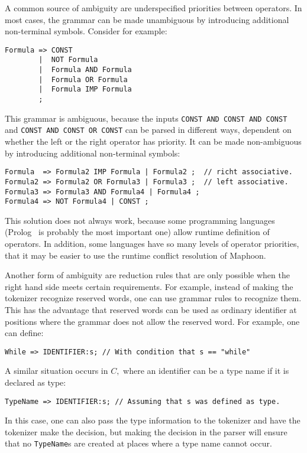 \documentclass{article}
\begin{document}
A common source of ambiguity are underspecified priorities
between operators. In most cases, the grammar can
be made unambiguous by introducing additional
non-terminal symbols. Consider for example:  
\begin{verbatim}
Formula => CONST    
        |  NOT Formula                
        |  Formula AND Formula    
        |  Formula OR Formula   
        |  Formula IMP Formula
        ;
\end{verbatim}
This grammar is ambiguous, because the 
inputs \verb|CONST AND CONST AND CONST|
and \verb|CONST AND CONST OR CONST| can
be parsed in different ways, 
dependent on whether the left or the 
right operator has priority.
It can be made non-ambiguous
by introducing additional non-terminal symbols: 
\begin{verbatim}
Formula  => Formula2 IMP Formula | Formula2 ;  // richt associative.
Formula2 => Formula2 OR Formula3 | Formula3 ;  // left associative.
Formula3 => Formula3 AND Formula4 | Formula4 ;
Formula4 => NOT Formula4 | CONST ;
\end{verbatim}

\noindent
This solution does not always work, because
some programming languages 
(Prolog~\cite{SterlingShapiro94} is probably the most important one) allow
runtime definition of operators.
In addition, some languages have so many levels of operator priorities,
that it may be easier
to use the runtime conflict resolution of Maphoon. 

Another form of ambiguity are reduction rules that are only
possible when the right hand side meets certain requirements.
For example, instead of making the tokenizer recognize reserved words,
one can use grammar rules to recognize them. 
This has the advantage that reserved words can be used as ordinary identifier
at positions where the grammar does not allow the reserved word. 
For example, one can define:
\begin{verbatim}
While => IDENTIFIER:s; // With condition that s == "while" \end{verbatim}

\noindent
A similar situation occurs in $ C, $ where an identifier can be
a type name if it is declared as type:
\begin{verbatim}
TypeName => IDENTIFIER:s; // Assuming that s was defined as type. \end{verbatim}
In this case, one can also pass the type information to the tokenizer
and have the tokenizer make the decision, but making the decision
in the parser will ensure that no \verb+TypeName+s are created
at places where a type name cannot occur. 
\end{document}
